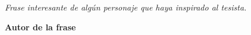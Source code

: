 \thispagestyle{empty}

\clearpage

\vspace*{16 cm}

\begin{flushright}
\sf	

\textit{Frase interesante de algún personaje que haya inspirado al tesista.}

\textbf{Autor de la frase}
\end{flushright}